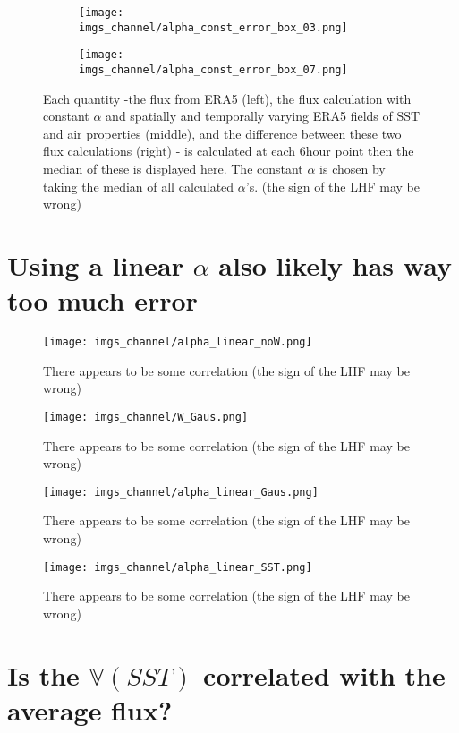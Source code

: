 \documentclass[12pt,a4paper]{article}
\begin{document}
\begin{figure}[h!]
\centering
\begin{subfigure}[t]{\textwidth}
\texttt{[image: imgs\_channel/alpha\_const\_error\_box\_03.png]}
\end{subfigure}
\begin{subfigure}[t]{\textwidth}
\texttt{[image: imgs\_channel/alpha\_const\_error\_box\_07.png]}
\end{subfigure}
\caption{Each quantity -the flux from ERA5 (left), the flux calculation with constant $\alpha$ and spatially and temporally varying ERA5 fields of SST and air properties (middle), and the difference between these two flux calculations (right) - is calculated at each 6hour point then the median of these is displayed here. The constant $\alpha$ is chosen by taking the median of all calculated $\alpha$'s. (the sign of the LHF may be wrong)}
\end{figure}

\section{Using a linear $\alpha$ also likely has way too much error}

\begin{figure}[h!]
\centering
\texttt{[image: imgs\_channel/alpha\_linear\_noW.png]}
\caption{There appears to be some correlation (the sign of the LHF may be wrong)}
\end{figure}

\begin{figure}[h!]
\centering
\texttt{[image: imgs\_channel/W\_Gaus.png]}
\caption{There appears to be some correlation (the sign of the LHF may be wrong)}
\end{figure}

\begin{figure}[h!]
\centering
\texttt{[image: imgs\_channel/alpha\_linear\_Gaus.png]}
\caption{There appears to be some correlation (the sign of the LHF may be wrong)}
\end{figure}

\begin{figure}[h!]
\centering
\texttt{[image: imgs\_channel/alpha\_linear\_SST.png]}
\caption{There appears to be some correlation (the sign of the LHF may be wrong)}
\end{figure}


\section{Is the $\mathbb{V}(SST)$ correlated with the average flux?}
\end{document}
